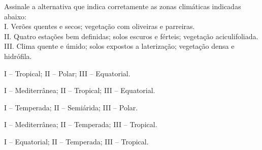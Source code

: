 \questao
Assinale a alternativa que indica corretamente as zonas climáticas indicadas abaixo:\\
I. Verões quentes e secos; vegetação com oliveiras e parreiras.\\
II. Quatro estações bem definidas; solos escuros e férteis; vegetação aciculifoliada.\\
III. Clima quente e úmido; solos expostos a laterização; vegetação densa e hidrófila.
\begin{alternativas}
\item I – Tropical; II – Polar; III – Equatorial.
\item I – Mediterrânea; II – Tropical; III – Equatorial.
\item I – Temperada; II – Semiárida; III – Polar.
\item I – Mediterrânea; II – Temperada; III – Tropical.
\item I – Equatorial;  II – Temperada; III – Tropical.
\end{alternativas}

